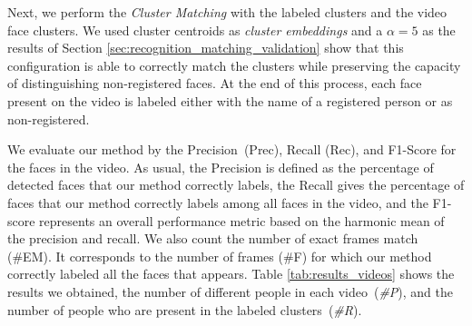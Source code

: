 Next, we perform the \emph{Cluster Matching} with the labeled clusters and the video face clusters.
We used cluster centroids as \emph{cluster embeddings} and a $\alpha=5$ as the results of Section \ref{sec:recognition_matching_validation} show that this configuration is able to correctly match the clusters while preserving the capacity of distinguishing non-registered faces.
At the end of this process, each face present on the video is labeled either with the name of a registered person or as non-registered.

We evaluate our method by the Precision~(Prec), Recall (Rec), and F1-Score for the faces in the video. 
As usual, the Precision is defined as the percentage of detected faces that our method correctly labels, 
the Recall gives the percentage of faces that our method correctly labels among all faces in the video, and 
the F1-score represents an overall performance metric based on the  harmonic mean of the precision and recall.
We also count the number of exact frames match (\#EM). It corresponds to the number of frames (\#F) for which our method correctly labeled all the faces that appears. %
Table \ref{tab:results_videos} shows the results we obtained, the number of different people in each video~(\emph{\#P}), and the number of people who are present in the labeled clusters~(\emph{\#R}).

